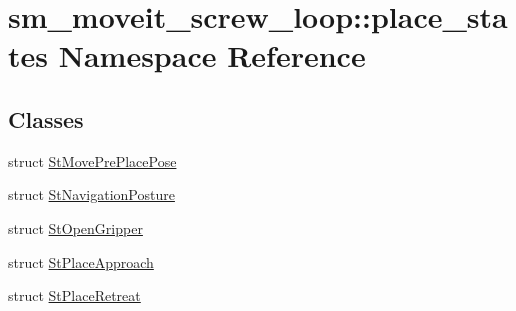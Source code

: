 \hypertarget{namespacesm__moveit__screw__loop_1_1place__states}{}\section{sm\+\_\+moveit\+\_\+screw\+\_\+loop\+:\+:place\+\_\+states Namespace Reference}
\label{namespacesm__moveit__screw__loop_1_1place__states}
\subsection*{Classes}
\begin{DoxyCompactItemize}
\item 
struct \hyperlink{structsm__moveit__screw__loop_1_1place__states_1_1StMovePrePlacePose}{St\+Move\+Pre\+Place\+Pose}
\item 
struct \hyperlink{structsm__moveit__screw__loop_1_1place__states_1_1StNavigationPosture}{St\+Navigation\+Posture}
\item 
struct \hyperlink{structsm__moveit__screw__loop_1_1place__states_1_1StOpenGripper}{St\+Open\+Gripper}
\item 
struct \hyperlink{structsm__moveit__screw__loop_1_1place__states_1_1StPlaceApproach}{St\+Place\+Approach}
\item 
struct \hyperlink{structsm__moveit__screw__loop_1_1place__states_1_1StPlaceRetreat}{St\+Place\+Retreat}
\end{DoxyCompactItemize}
